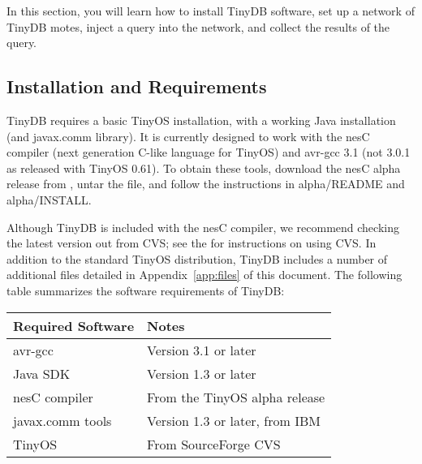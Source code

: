 \documentclass[11pt]{article}
\begin{document}
In this section, you will learn how to install TinyDB software, set up a network of TinyDB motes, inject a query
into the network, and collect the results of the query.  

\subsection{Installation and Requirements}
TinyDB requires a basic TinyOS installation, with a working Java
installation (and javax.comm library).  
It is currently designed to work with the nesC compiler (next generation C-like language for TinyOS) 
and avr-gcc 3.1  (not 3.0.1 as released with TinyOS 0.61).  To obtain these tools, download the 
nesC  alpha release from , untar the file, and follow the instructions in alpha/README and alpha/INSTALL.

Although TinyDB is included with the nesC compiler, we recommend checking the latest 
version out from CVS;
see the
for instructions on using CVS.
In addition to the standard TinyOS distribution, TinyDB includes a number of
additional files detailed in Appendix~\ref{app:files} of this document. The following table summarizes the software requirements of TinyDB: 

\par
\tiny
\begin{tabular}{|l|l|}
\hline
Required Software & Notes \\
\hline\hline
avr-gcc \index{avr-gcc}\index{gcc} & Version 3.1 or later \\ 
Java SDK \index{Java} & Version 1.3 or later \\
nesC compiler \index{nesC} & From the TinyOS alpha release \\
javax.comm tools & Version 1.3 or later, from IBM \\
TinyOS & From SourceForge CVS \\
\hline
\end{tabular}
\normalsize
\\
\end{document}
